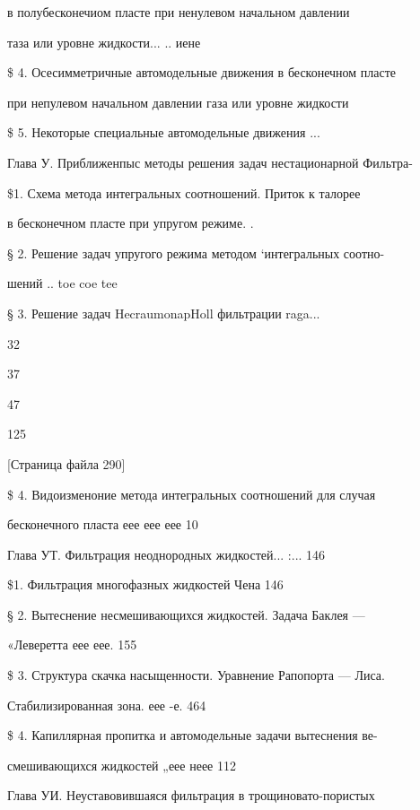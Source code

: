 \documentclass[
  11pt,
]{article}
\begin{document}
в полубесконечиом пласте при ненулевом начальном давлении\par
таза или уровне жидкости... .. иене\par
\$ 4. Осесимметричные автомодельные движения в бесконечном пласте\par
при непулевом начальном давлении газа или уровне жидкости\par
\$ 5. Некоторые специальные автомодельные движения ...\par
\smallskip
Глава У. Приближенпыс методы решения задач нестационарной Фильтра-\par
\smallskip
\$1. Схема метода интегральных соотношений. Приток к талорее\par
в бесконечном пласте при упругом режиме. .\par
\smallskip
§ 2. Решение задач упругого режима методом `интегральных соотно-\par
шений .. toe coe tee\par
\smallskip
§ 3. Решение задач HecraumonapHoll фильтрации raga...\par
{}\par
{}\par
32\par
37\par
47\par
{}\par
125\par
\smallskip
{[}Страница файла 290{]}\par
\$ 4. Видоизменоние метода интегральных соотношений для случая\par
бесконечного пласта еее еее еее 10\par
\smallskip
Глава УТ. Фильтрация неоднородных жидкостей... :... 146\par
\smallskip
\$1. Фильтрация многофазных жидкостей Чена 146\par
§ 2. Вытеснение несмешивающихся жидкостей. Задача Баклея ---\par
\smallskip
«Леверетта еее еее. 155\par
\$ 3. Структура скачка насыщенности. Уравнение Рапопорта --- Лиса.\par
\smallskip
Стабилизированная зона. еее -е. 464\par
\$ 4. Капиллярная пропитка и автомодельные задачи вытеснения ве-\par
\smallskip
смешивающихся жидкостей „еее неее 112\par
\smallskip
Глава УИ. Неуставовившаяся фильтрация в  трощиновато-пористых\par
\end{document}
